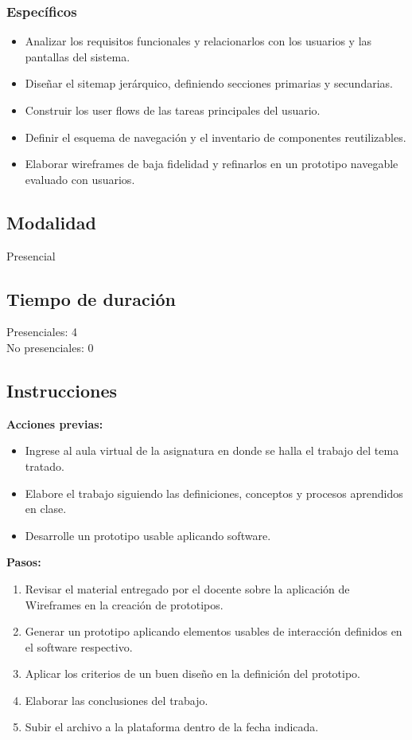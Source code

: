 \documentclass{article}
\begin{document}
\subsubsection{Específicos}
\begin{itemize}[leftmargin=1.5em, itemsep=3pt]
    \item Analizar los requisitos funcionales y relacionarlos con los usuarios y las pantallas del sistema.
    \item Diseñar el sitemap jerárquico, definiendo secciones primarias y secundarias.
    \item Construir los user flows de las tareas principales del usuario.
    \item Definir el esquema de navegación y el inventario de componentes reutilizables.
    \item Elaborar wireframes de baja fidelidad y refinarlos en un prototipo navegable evaluado con usuarios.
\end{itemize}

\subsection{Modalidad}
Presencial

\subsection{Tiempo de duración}
Presenciales: 4\\
No presenciales: 0

\subsection{Instrucciones}
\textbf{Acciones previas:}
\begin{itemize}[leftmargin=1.5em, itemsep=3pt]
    \item Ingrese al aula virtual de la asignatura en donde se halla el trabajo del tema tratado.
    \item Elabore el trabajo siguiendo las definiciones, conceptos y procesos aprendidos en clase.
    \item Desarrolle un prototipo usable aplicando software.
\end{itemize}

\textbf{Pasos:}
\begin{enumerate}[leftmargin=1.5em, itemsep=3pt]
    \item Revisar el material entregado por el docente sobre la aplicación de Wireframes en la creación de prototipos.
    \item Generar un prototipo aplicando elementos usables de interacción definidos en el software respectivo.
    \item Aplicar los criterios de un buen diseño en la definición del prototipo.
    \item Elaborar las conclusiones del trabajo.
    \item Subir el archivo a la plataforma dentro de la fecha indicada.
\end{enumerate}
\end{document}
